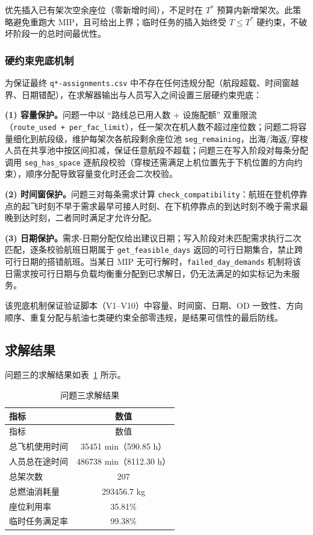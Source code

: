 优先插入已有架次空余座位（零新增时间），不足时在 $T^*$ 预算内新增架次。此策略避免重跑大 MIP，且可给出上界；临时任务的插入始终受 $T \le T^*$ 硬约束，不破坏阶段一的总时间最优性。

\subsubsection{硬约束兜底机制}

为保证最终 \texttt{q*-assignments.csv} 中不存在任何违规分配（航段超载、时间窗越界、日期错配），在求解器输出与人员写入之间设置三层硬约束兜底：

\textbf{(1) 容量保护。}问题一中以 ``路线总已用人数 + 设施配额'' 双重限流（\texttt{route\_used + per\_fac\_limit}），任一架次在机人数不超过座位数；问题二将容量细化到航段级，维护每架次各航段剩余座位池 \texttt{seg\_remaining}，出海/海返/穿梭人员在共享池中按区间扣减，保证任意航段不超载；问题三在写入阶段对每条分配调用 \texttt{seg\_has\_space} 逐航段校验（穿梭还需满足上机位置先于下机位置的方向约束），顺序分配导致容量变化时还会二次校验。

\textbf{(2) 时间窗保护。}问题三对每条需求计算 \texttt{check\_compatibility}：航班在登机停靠点的起飞时刻不早于需求最早可接人时刻、在下机停靠点的到达时刻不晚于需求最晚到达时刻，二者同时满足才允许分配。

\textbf{(3) 日期保护。}需求-日期分配仅给出建议日期；写入阶段对未匹配需求执行二次匹配，逐条校验航班日期属于 \texttt{get\_feasible\_days} 返回的可行日期集合，禁止跨可行日期的搭错航班。当某日 MIP 无可行解时，\texttt{failed\_day\_demands} 机制将该日需求按可行日期与负载均衡重分配到已求解日，仍无法满足的如实标记为未服务。

该兜底机制保证验证脚本（V1--V10）中容量、时间窗、日期、OD 一致性、方向顺序、重复分配与航油七类硬约束全部零违规，是结果可信性的最后防线。

\subsection{求解结果}

问题三的求解结果如表~\ref{tab:q3_result} 所示。

\begin{longtable}{lc}
\caption{问题三求解结果} \label{tab:q3_result} \\
\toprule
指标 & 数值 \\
\midrule
\endfirsthead
\toprule
指标 & 数值 \\
\midrule
\endhead
\bottomrule
\endfoot
\bottomrule
\endlastfoot
总飞机使用时间 & 35451 min（590.85 h） \\
人员总在途时间 & 486738 min（8112.30 h） \\
总架次数 & 207 \\
总燃油消耗量 & 293456.7 kg \\
座位利用率 & 35.81\% \\
临时任务满足率 & 99.38\% \\
\end{longtable}
